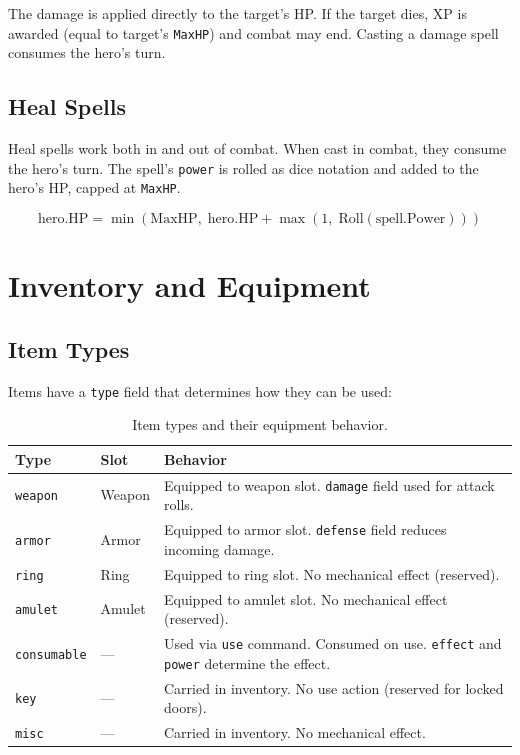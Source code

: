 \documentclass[a4paper,10pt]{article}
\newcommand{\cmd}[1]{\texttt{#1}}
\newcommand{\field}[1]{\texttt{#1}}
\begin{document}
The damage is applied directly to the target's HP. If the target dies,
XP is awarded (equal to target's \field{MaxHP}) and combat may end.
Casting a damage spell consumes the hero's turn.

\subsection{Heal Spells}

Heal spells work both in and out of combat. When cast in combat, they
consume the hero's turn. The spell's \field{power} is rolled as dice
notation and added to the hero's HP, capped at \field{MaxHP}.

\[
  \text{hero.HP} = \min(\text{MaxHP},\; \text{hero.HP} + \max(1,\; \text{Roll}(\text{spell.Power})))
\]

\section{Inventory and Equipment}

\subsection{Item Types}

Items have a \field{type} field that determines how they can be used:

\begin{table}[h]
\centering
\begin{tabular}{@{}llp{7cm}@{}}
\toprule
\textbf{Type} & \textbf{Slot} & \textbf{Behavior} \\
\midrule
\texttt{weapon}     & Weapon & Equipped to weapon slot. \field{damage} field used for attack rolls. \\
\texttt{armor}      & Armor  & Equipped to armor slot. \field{defense} field reduces incoming damage. \\
\texttt{ring}       & Ring   & Equipped to ring slot. No mechanical effect (reserved). \\
\texttt{amulet}     & Amulet & Equipped to amulet slot. No mechanical effect (reserved). \\
\texttt{consumable} & ---    & Used via \cmd{use} command. Consumed on use. \field{effect} and \field{power} determine the effect. \\
\texttt{key}        & ---    & Carried in inventory. No use action (reserved for locked doors). \\
\texttt{misc}       & ---    & Carried in inventory. No mechanical effect. \\
\bottomrule
\end{tabular}
\caption{Item types and their equipment behavior.}
\end{table}
\end{document}
